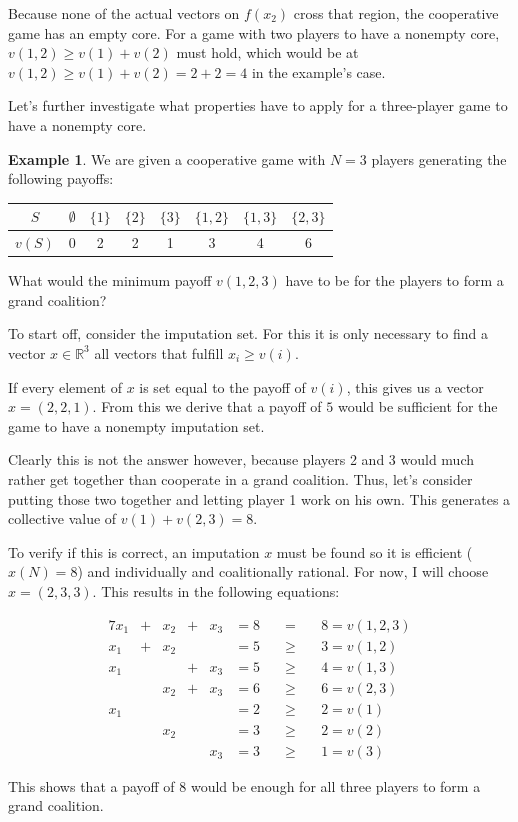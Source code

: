 \documentclass[10pt,a4paper,titlepage]{article}
\theoremstyle{plain}
\theoremstyle{definition}
\newtheorem{example}[thm]{Example} %
\begin{document}
Because none of the actual vectors on $f(x_2)$ cross that region, the cooperative game has an empty core. For a game with two players to have a nonempty core, $v(1, 2) \geq v(1) + v(2)$ must hold, which would be at $v(1, 2) \geq v(1) + v(2) = 2 + 2 = 4$ in the example's case.

Let's further investigate what properties have to apply for a three-player game to have a nonempty core.

\begin{example}\label{ex:findvalue}
    We are given a cooperative game with $N = 3$ players generating the following payoffs:

    \begin{tabular}{c | c c c c c c c}
        $S$ & $\emptyset$ & $\{1\}$ & $\{2\}$ & $\{3\}$ & $\{1, 2\}$ & $\{1, 3\}$ & $\{2, 3\}$\\
        \hline
        $v(S)$ & 0 & 2 & 2 & 1 & 3 & 4 & 6
    \end{tabular}

    What would the minimum payoff $v(1, 2, 3)$ have to be for the players to form a grand coalition?\vspace{10pt}

    To start off, consider the imputation set. For this it is only necessary to find a vector $x \in \mathbb{R}^3$ all vectors that fulfill $x_i \geq v(i)$.

    If every element of $x$ is set equal to the payoff of $v(i)$, this gives us a vector $x = (2, 2, 1)$. From this we derive that a payoff of $5$ would be sufficient for the game to have a nonempty imputation set.

    Clearly this is not the answer however, because players 2 and 3 would much rather get together than cooperate in a grand coalition. Thus, let's consider putting those two together and letting player 1 work on his own. This generates a collective value of $v(1) + v(2, 3) = 8$.

    To verify if this is correct, an imputation $x$ must be found so it is efficient ($x(N) = 8$) and individually and coalitionally rational. For now, I will choose $x = (2, 3, 3)$. This results in the following equations:

    \begin{alignat*}{7}
    x_1 &+ &x_2 &+ &x_3 &= 8 \quad&=&\quad 8 = v(1, 2, 3)\\
    x_1 &+ &x_2 &  &    &= 5 &\geq &\quad 3 = v(1, 2)\\
    x_1 &  &    &+ &x_3 &= 5 &\geq &\quad 4 = v(1, 3)\\
        &  &x_2 &+ &x_3 &= 6 &\geq &\quad 6 = v(2, 3)\\
    x_1 &  &    &  &    &= 2 &\geq &\quad 2 = v(1)\\
        &  &x_2 &  &    &= 3 &\geq &\quad 2 = v(2)\\
        &  &    &  &x_3 &= 3 &\geq &\quad 1 = v(3)
    \end{alignat*}

    This shows that a payoff of 8 would be enough for all three players to form a grand coalition.
\end{example}
\end{document}
